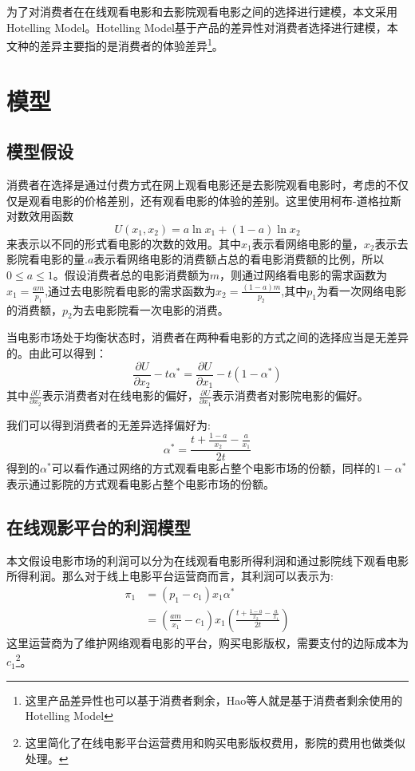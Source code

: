 \documentclass[paper=a4, fontsize=10.5pt]{scrartcl} %
\numberwithin{equation}{section} %
\numberwithin{figure}{section} %
\numberwithin{table}{section} %
\begin{document}
\begin{CJK}{UTF8}{gbsn}
为了对消费者在在线观看电影和去影院观看电影之间的选择进行建模，本文采用Hotelling Model。Hotelling Model基于产品的差异性对消费者选择进行建模，本文种的差异主要指的是消费者的体验差异\footnote{这里产品差异性也可以基于消费者剩余，Hao等人就是基于消费者剩余使用的Hotelling Model\cite{LinHao2014}}。

\section{模型}
\subsection{模型假设}
消费者在选择是通过付费方式在网上观看电影还是去影院观看电影时，考虑的不仅仅是观看电影的价格差别，还有观看电影的体验的差别。这里使用柯布-道格拉斯对数效用函数$$U(x_1,x_2) = a \ln x_1 + (1-a) \ln x_2$$来表示以不同的形式看电影的次数的效用。其中$x_1$表示看网络电影的量，$x_2$表示去影院看电影的量.$a$表示看网络电影的消费额占总的看电影消费额的比例，所以$0 \le a \le 1$。假设消费者总的电影消费额为$m$，则通过网络看电影的需求函数为$x_1 = \frac{am}{p_1}$,通过去电影院看电影的需求函数为$x_2 = \frac{(1-a)m}{p_2}$,其中$p_1$为看一次网络电影的消费额，$p_2$为去电影院看一次电影的消费。

当电影市场处于均衡状态时，消费者在两种看电影的方式之间的选择应当是无差异的。由此可以得到：$$\frac{\partial U}{\partial x_2} - t\alpha^* =\frac{\partial U}{\partial x_1}  - t(1-\alpha^*)$$
其中$\frac{\partial U}{\partial x_2}$表示消费者对在线电影的偏好，$\frac{\partial U}{\partial x_1}$表示消费者对影院电影的偏好。

我们可以得到消费者的无差异选择偏好为:$$\alpha^*  = \frac{t+\frac{1-a}{x_2} -\frac{a}{x_1}}{2t}$$
得到的$\alpha^*$可以看作通过网络的方式观看电影占整个电影市场的份额，同样的$1-\alpha^*$表示通过影院的方式观看电影占整个电影市场的份额。

\subsection{在线观影平台的利润模型}
本文假设电影市场的利润可以分为在线观看电影所得利润和通过影院线下观看电影所得利润。那么对于线上电影平台运营商而言，其利润可以表示为:
\begin{equation*}
\begin{split}
\pi_1 
&= (p_1 - c_1)x_1\alpha^*\\
&= (\frac{am}{x_1} - c_1)x_1(\frac{t+\frac{1-a}{x_2} -\frac{a}{x_1}}{2t})
\end{split}
\end{equation*}
 这里运营商为了维护网络观看电影的平台，购买电影版权，需要支付的边际成本为$c_1$\footnote{这里简化了在线电影平台运营费用和购买电影版权费用，影院的费用也做类似处理。}。
 

\end{CJK}
\end{document}
